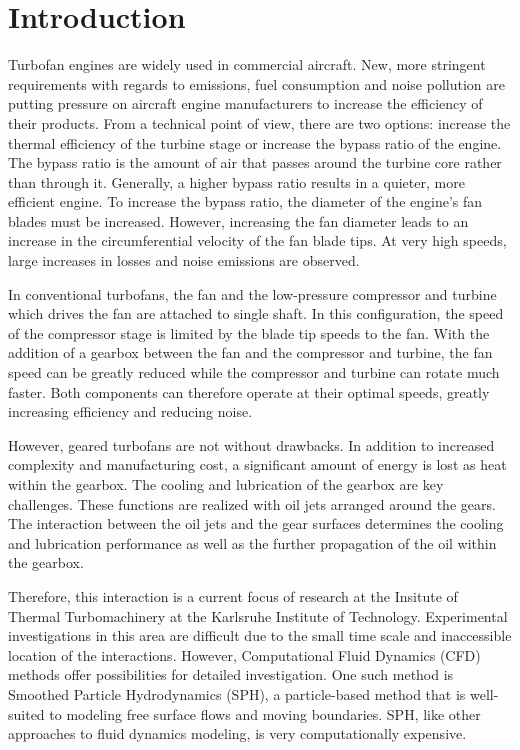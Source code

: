 \cleardoublepage


\chapter{Introduction}
\label{Chapter: Introduction}

Turbofan engines are widely used in commercial aircraft.  New, more stringent requirements with regards to emissions, fuel consumption and noise pollution are putting pressure on aircraft engine manufacturers to increase the efficiency of their products. From a technical point of view, there are two options: increase the thermal efficiency of the turbine stage or increase the bypass ratio of the engine. The bypass ratio is the amount of air that passes around the turbine core rather than through it.  Generally, a higher bypass ratio results in a quieter, more efficient engine. To increase the bypass ratio, the diameter of the engine's fan blades must be increased.  However, increasing the fan diameter leads to an increase in the circumferential velocity of the fan blade tips.  At very high speeds, large increases in losses and noise emissions are observed.

In conventional turbofans, the fan and the low-pressure compressor and turbine which drives the fan are attached to single shaft.  In this configuration, the speed of the compressor stage is limited by the blade tip speeds to the fan.  With the addition of a gearbox between the fan and the compressor and turbine, the fan speed can be greatly reduced while the compressor and turbine can rotate much faster.  Both components can therefore operate at their optimal speeds, greatly increasing efficiency and reducing noise.

However, geared turbofans are not without drawbacks.  In addition to increased complexity and manufacturing cost, a significant amount of energy is lost as heat within the gearbox.  The cooling and lubrication of the gearbox are key challenges.  These functions are realized with oil jets arranged around the gears.  The interaction between the oil jets and the gear surfaces determines the cooling and lubrication performance as well as the further propagation of the oil within the gearbox.

Therefore, this interaction is a current focus of research at the Insitute of Thermal Turbomachinery at the Karlsruhe Institute of Technology.  Experimental investigations in this area are difficult due to the small time scale and inaccessible location of the interactions. However, Computational Fluid Dynamics (CFD) methods offer possibilities for detailed investigation. One such method is Smoothed Particle Hydrodynamics (SPH), a particle-based method that is well-suited to modeling free surface flows and moving boundaries.  SPH, like other approaches to fluid dynamics modeling, is very computationally expensive.

